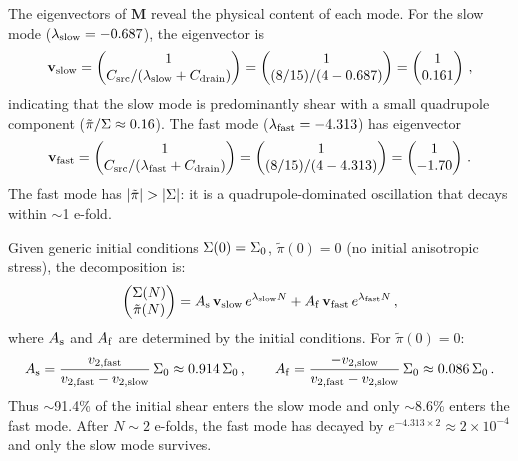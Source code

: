 The eigenvectors of $\mathbf{M}$ reveal the physical content of each mode.  For the slow mode ($\lambda_{\rm slow} = -0.687$), the eigenvector is
\begin{equation}
\mathbf{v}_{\rm slow} = \begin{pmatrix} 1 \\ C_{\rm src}/(\lambda_{\rm slow} + C_{\rm drain}) \end{pmatrix} = \begin{pmatrix} 1 \\ (8/15)/(4 - 0.687) \end{pmatrix} = \begin{pmatrix} 1 \\ 0.161 \end{pmatrix}\,,
\end{equation}
indicating that the slow mode is predominantly shear with a small quadrupole component ($\tilde\pi/\Sigma \approx 0.16$).  The fast mode ($\lambda_{\rm fast} = -4.313$) has eigenvector
\begin{equation}
\mathbf{v}_{\rm fast} = \begin{pmatrix} 1 \\ C_{\rm src}/(\lambda_{\rm fast} + C_{\rm drain}) \end{pmatrix} = \begin{pmatrix} 1 \\ (8/15)/(4 - 4.313) \end{pmatrix} = \begin{pmatrix} 1 \\ -1.70 \end{pmatrix}\,.
\end{equation}
The fast mode has $|\tilde\pi| > |\Sigma|$: it is a quadrupole-dominated oscillation that decays within $\sim$1 e-fold.

Given generic initial conditions $\Sigma(0) = \Sigma_0$, $\tilde\pi(0) = 0$ (no initial anisotropic stress), the decomposition is:
\begin{equation}
\begin{pmatrix} \Sigma(N) \\ \tilde\pi(N) \end{pmatrix} = A_{\rm s}\,\mathbf{v}_{\rm slow}\,e^{\lambda_{\rm slow} N} + A_{\rm f}\,\mathbf{v}_{\rm fast}\,e^{\lambda_{\rm fast} N}\,,
\end{equation}
where $A_{\rm s}$ and $A_{\rm f}$ are determined by the initial conditions.  For $\tilde\pi(0) = 0$:
\begin{equation}
A_{\rm s} = \frac{v_{2,\rm fast}}{v_{2,\rm fast} - v_{2,\rm slow}}\,\Sigma_0 \approx 0.914\,\Sigma_0\,,\qquad A_{\rm f} = \frac{-v_{2,\rm slow}}{v_{2,\rm fast} - v_{2,\rm slow}}\,\Sigma_0 \approx 0.086\,\Sigma_0\,.
\end{equation}
Thus $\sim$91.4\% of the initial shear enters the slow mode and only $\sim$8.6\% enters the fast mode.  After $N \sim 2$ e-folds, the fast mode has decayed by $e^{-4.313 \times 2} \approx 2 \times 10^{-4}$ and only the slow mode survives.

